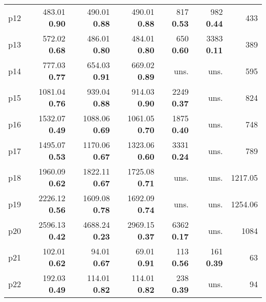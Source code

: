 \begin{tabular}{lrrrrrr}
\multicolumn{1}{l|}{p12} & {\footnotesize 483.01} \textbf{0.90} & {\footnotesize 490.01} \textbf{0.88} & {\footnotesize 490.01} \textbf{0.88} & {\footnotesize 817} \textbf{0.53} & {\footnotesize 982} \textbf{0.44} & \multicolumn{1}{|r}{433}\\
\multicolumn{1}{l|}{p13} & {\footnotesize 572.02} \textbf{0.68} & {\footnotesize 486.01} \textbf{0.80} & {\footnotesize 484.01} \textbf{0.80} & {\footnotesize 650} \textbf{0.60} & {\footnotesize 3383} \textbf{0.11} & \multicolumn{1}{|r}{389}\\
\multicolumn{1}{l|}{p14} & {\footnotesize 777.03} \textbf{0.77} & {\footnotesize 654.03} \textbf{0.91} & {\footnotesize 669.02} \textbf{0.89} & uns. & uns. & \multicolumn{1}{|r}{595}\\
\multicolumn{1}{l|}{p15} & {\footnotesize 1081.04} \textbf{0.76} & {\footnotesize 939.04} \textbf{0.88} & {\footnotesize 914.03} \textbf{0.90} & {\footnotesize 2249} \textbf{0.37} & uns. & \multicolumn{1}{|r}{824}\\
\multicolumn{1}{l|}{p16} & {\footnotesize 1532.07} \textbf{0.49} & {\footnotesize 1088.06} \textbf{0.69} & {\footnotesize 1061.05} \textbf{0.70} & {\footnotesize 1875} \textbf{0.40} & uns. & \multicolumn{1}{|r}{748}\\
\multicolumn{1}{l|}{p17} & {\footnotesize 1495.07} \textbf{0.53} & {\footnotesize 1170.06} \textbf{0.67} & {\footnotesize 1323.06} \textbf{0.60} & {\footnotesize 3331} \textbf{0.24} & uns. & \multicolumn{1}{|r}{789}\\
\multicolumn{1}{l|}{p18} & {\footnotesize 1960.09} \textbf{0.62} & {\footnotesize 1822.11} \textbf{0.67} & {\footnotesize 1725.08} \textbf{0.71} & uns. & uns. & \multicolumn{1}{|r}{1217.05}\\
\multicolumn{1}{l|}{p19} & {\footnotesize 2226.12} \textbf{0.56} & {\footnotesize 1609.08} \textbf{0.78} & {\footnotesize 1692.09} \textbf{0.74} & uns. & uns. & \multicolumn{1}{|r}{1254.06}\\
\multicolumn{1}{l|}{p20} & {\footnotesize 2596.13} \textbf{0.42} & {\footnotesize 4688.24} \textbf{0.23} & {\footnotesize 2969.15} \textbf{0.37} & {\footnotesize 6362} \textbf{0.17} & uns. & \multicolumn{1}{|r}{1084}\\
\multicolumn{1}{l|}{p21} & {\footnotesize 102.01} \textbf{0.62} & {\footnotesize 94.01} \textbf{0.67} & {\footnotesize 69.01} \textbf{0.91} & {\footnotesize 113} \textbf{0.56} & {\footnotesize 161} \textbf{0.39} & \multicolumn{1}{|r}{63}\\
\multicolumn{1}{l|}{p22} & {\footnotesize 192.03} \textbf{0.49} & {\footnotesize 114.01} \textbf{0.82} & {\footnotesize 114.01} \textbf{0.82} & {\footnotesize 238} \textbf{0.39} & uns. & \multicolumn{1}{|r}{94}\\

\end{tabular}
